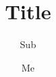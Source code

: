\documentclass[17pt]{beamer}
\title{Title}
\subtitle{Sub}
\author{Me}
\institute{Here}
\date{}
\begin{document}
\begin{frame}
\titlepage
\end{frame}
\end{document}
